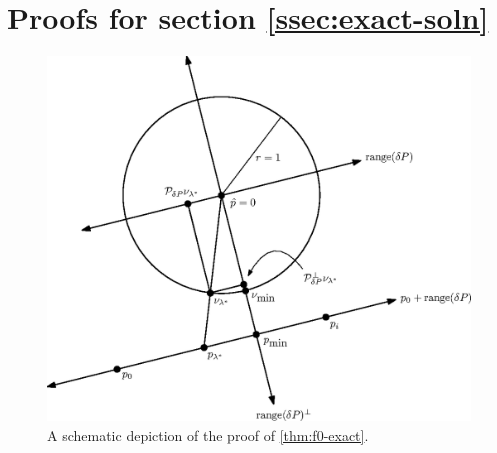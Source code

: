 \documentclass[sisc-eikonal.tex]{subfiles}
\begin{document}
\section{Proofs for section
  \ref{ssec:exact-soln}}\label{sec:exact-soln-proofs}

\begin{figure}
  \centering
  \includegraphics[width=0.65\linewidth]{f0-exact.eps}
  \caption{A schematic depiction of the proof of
    \cref{thm:f0-exact}.}\label{fig:f0-exact}
\end{figure}
\end{document}
